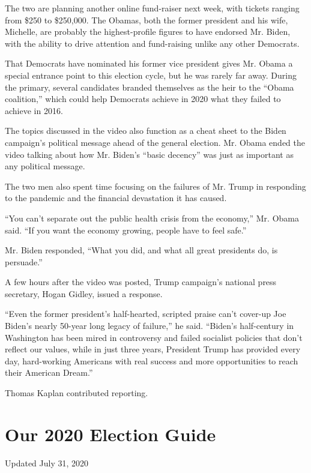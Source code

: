 The two are planning another online fund-raiser next week, with tickets
ranging from \$250 to \$250,000. The Obamas, both the former president
and his wife, Michelle, are probably the highest-profile figures to have
endorsed Mr. Biden, with the ability to drive attention and fund-raising
unlike any other Democrats.

That Democrats have nominated his former vice president gives Mr. Obama
a special entrance point to this election cycle, but he was rarely far
away. During the primary, several candidates branded themselves as the
heir to the ``Obama coalition,'' which could help Democrats achieve in
2020 what they failed to achieve in 2016.

The topics discussed in the video also function as a cheat sheet to the
Biden campaign's political message ahead of the general election. Mr.
Obama ended the video talking about how Mr. Biden's ``basic decency''
was just as important as any political message.

The two men also spent time focusing on the failures of Mr. Trump in
responding to the pandemic and the financial devastation it has caused.

``You can't separate out the public health crisis from the economy,''
Mr. Obama said. ``If you want the economy growing, people have to feel
safe.''

Mr. Biden responded, ``What you did, and what all great presidents do,
is persuade.''

A few hours after the video was posted, Trump campaign's national press
secretary, Hogan Gidley, issued a response.

``Even the former president's half-hearted, scripted praise can't
cover-up Joe Biden's nearly 50-year long legacy of failure,'' he said.
``Biden's half-century in Washington has been mired in controversy and
failed socialist policies that don't reflect our values, while in just
three years, President Trump has provided every day, hard-working
Americans with real success and more opportunities to reach their
American Dream.''

Thomas Kaplan contributed reporting.

\hypertarget{our-2020-election-guide}{%
\section{Our 2020 Election Guide}\label{our-2020-election-guide}}

Updated July 31, 2020

